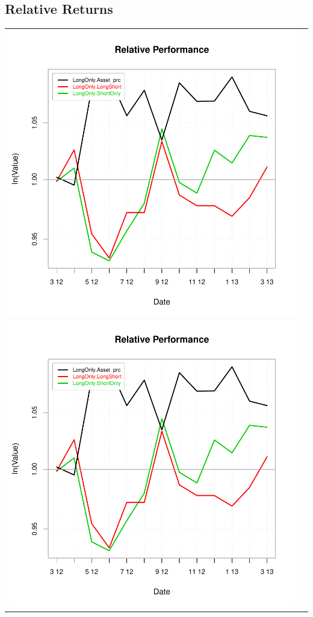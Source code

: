 \documentclass{article}
\begin{document}
\subsection{Relative Returns}
\begin{tabular}{cc}
\includegraphics{graphics/plot-018}
\includegraphics{graphics/plot-019}
\end{tabular}
\end{document}
